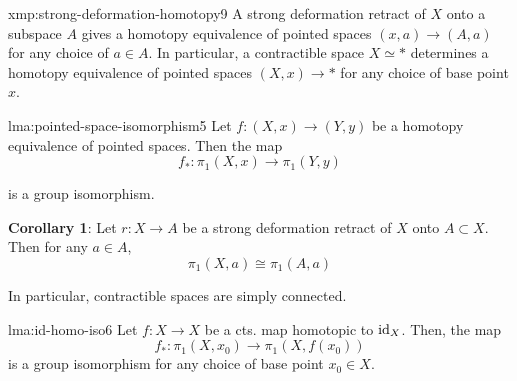 \documentclass[landscape, 8pt]{extarticle}
\begin{document}
\begin{multicols*}{3}
\vspace{-7pt}
\begin{xmp}{xmp:strong-deformation-homotopy}{9}
	\vspace{-2pt}
	A strong deformation retract of $X$ onto a subspace $A$ gives a homotopy equivalence of pointed spaces $(x, a) \to (A, a)$ for any choice of $a\in A$. In particular, a contractible space $X \simeq \ast$ determines a homotopy equivalence of pointed spaces $(X, x) \to \ast$ for any choice of base point $x$.
\end{xmp}

\vspace{-7pt}
\begin{lma}{lma:pointed-space-isomorphism}{5}
	\vspace{-2pt}
	Let $f : (X, x) \to (Y, y)$ be a homotopy equivalence of pointed spaces. Then the map
	\vspace{-3pt}
	\[f_{\ast} : \pi_{1}(X, x) \to \pi_{1}(Y, y)\]
	\par\vspace{-2pt}
	is a group isomorphism.

	\tcbline
	\textbf{Corollary 1}: Let $r : X \to A$ be a strong deformation retract of $X$ onto $A \subset X$. Then for any $a\in A$,
	\vspace{-4pt}
	\[\pi_{1}(X, a) \cong \pi_{1}(A, a)\]
	\par\vspace{-2pt}
	In particular, contractible spaces are simply connected.
\end{lma}

\vspace{-7pt}
\begin{lma}{lma:id-homo-iso}{6}
	\vspace{-2pt}
	Let $f : X \to X$ be a cts. map homotopic to $\operatorname{id}_{X}$. Then, the map
	\[f_{\ast} : \pi_{1}(X, x_{0}) \to \pi_{1}(X, f(x_{0}))\]
	is a group isomorphism for any choice of base point $x_{0}\in X$.
\end{lma}


\end{multicols*}
\end{document}
